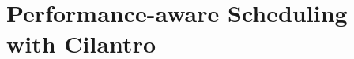 \chapter{Performance-aware Scheduling with Cilantro}
\label{ch_cilantro}


\newcommand{\cilantropolicyheader}[1]{\underline{#1}}
















% 


% 
